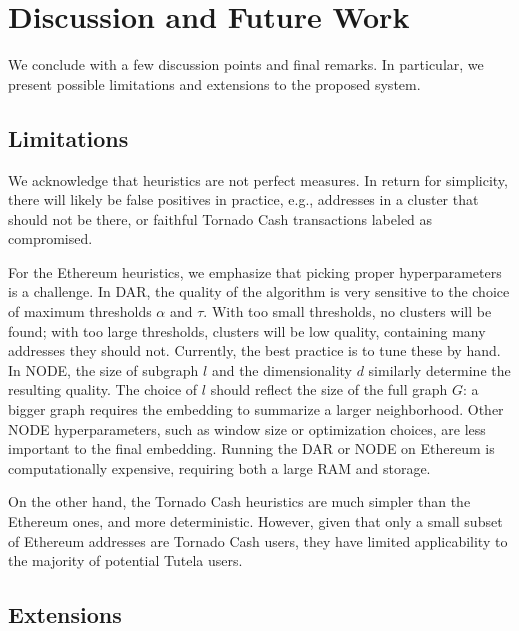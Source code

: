 \section{Discussion and Future Work}
\label{sec:discussion}

We conclude with a few discussion points and final remarks. In particular, we present possible limitations and extensions to the proposed system.

\subsection{Limitations}

We acknowledge that heuristics are not perfect measures. In return for simplicity, there will likely be false positives in practice, e.g., addresses in a cluster that should not be there, or faithful Tornado Cash transactions labeled as compromised.

For the Ethereum heuristics, we emphasize that picking proper hyperparameters is a challenge. In DAR, the quality of the algorithm is very sensitive to the choice of maximum thresholds $\alpha$ and $\tau$. With too small thresholds, no clusters will be found; with too large thresholds, clusters will be low quality, containing many addresses they should not. Currently, the best practice is to tune these by hand. In NODE, the size of subgraph $l$ and the dimensionality $d$ similarly determine the resulting quality. The choice of $l$ should reflect the size of the full graph $G$: a bigger graph requires the embedding to summarize a larger neighborhood. Other NODE hyperparameters, such as window size or optimization choices, are less important to the final embedding. Running the DAR or NODE on Ethereum is computationally expensive, requiring both a large RAM and storage.

On the other hand, the Tornado Cash heuristics are much simpler than the Ethereum ones, and more deterministic.
However, given that only a small subset of Ethereum addresses are Tornado Cash users, they have limited applicability to the majority of potential Tutela users.


\subsection{Extensions}

